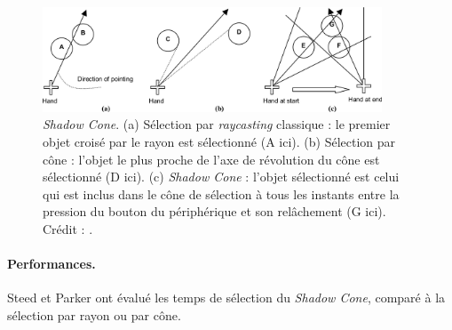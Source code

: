 	\begin{figure}[!htb]
		\centering
		\includegraphics[width=0.9\textwidth]{figures/ch2/shadow}
		\caption[Fonctionnement du \emph{Shadow Cone}]{\emph{Shadow Cone}. (a) Sélection par \emph{raycasting} classique : le premier objet croisé par le rayon est sélectionné (A ici). (b) Sélection par cône : l'objet le plus proche de l'axe de révolution du cône est sélectionné (D ici). (c) \emph{Shadow Cone} : l'objet sélectionné est celui qui est inclus dans le cône de sélection à tous les instants entre la pression du bouton du périphérique et son relâchement (G ici). Crédit : \cite{steed20043d}.}
		\label{fig:shadow}
	\end{figure}
	
	\paragraph{Performances.}
	Steed et Parker ont évalué les temps de sélection du \emph{Shadow Cone}, comparé à la sélection par rayon ou par cône.

